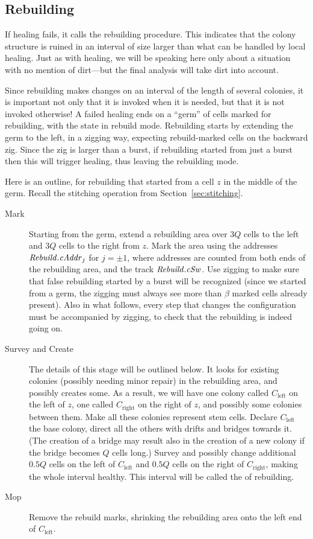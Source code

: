 \documentclass[12pt]{memoir}
\newcommand{\fld}[1]{\ensuremath{\textit{#1\/}}}
\newcommand{\Q}{Q}
\newcommand{\cAddr}{\fld{cAddr}}
\newcommand{\Rebuild}{\fld{Rebuild}}
\newcommand{\cSweep}{\fld{cSw}}
\newcommand{\Left}{\text{left}}
\newcommand{\Right}{\text{right}}
\begin{document}
\subsection{Rebuilding}\label{sec:rebuilding}

If healing fails, it calls the rebuilding procedure.
This indicates that the colony structure is ruined in an interval of size larger than 
what can be handled by local healing.
Just as with healing, we will be speaking here only about a situation with no 
mention of dirt---but the final analysis will take dirt into account.

Since rebuilding makes changes on an interval of the length of several colonies,
it is important not only that it is invoked when it is needed, but that it is not
invoked otherwise!
A failed healing ends on a ``germ'' of cells marked for rebuilding,
with the state in rebuild mode.
Rebuilding starts by extending the germ to the left, in a zigging way,
expecting rebuild-marked cells on the backward zig.
Since the zig is larger than a burst, if rebuilding started from just a burst then this
will trigger healing, thus leaving the rebuilding mode.

Here is an outline, for rebuilding that started from a cell \( z \) in the middle
of the germ.
Recall the stitching operation from Section~\ref{sec:stitching}.
\begin{description}
 \item[Mark] Starting from the germ, extend a rebuilding area  over \( 3\Q \) cells to the left 
and \( 3\Q \) cells to the right from \( z \).
Mark the area using the addresses \( \Rebuild.\cAddr_{j} \) for \( j=\pm 1 \), where addresses are counted from both 
ends of the rebuilding area, and the track \( \Rebuild.\cSweep \).
Use zigging to make sure that false rebuilding started by a burst will be recognized (since we started from a germ,
the zigging must always see more than \( \beta \) marked cells already present).
Also in what follows, every step that changes the configuration must be accompanied by zigging, to check that
the rebuilding is indeed going on.

 \item[Survey and Create]
The details of this stage will be outlined below.
It looks for existing colonies (possibly needing minor repair) in the rebuilding area, and 
possibly creates some.
As a result, we will have one colony called \( C_{\Left} \) 
on the left of \( z \), one called \( C_{\Right} \) on the right of \( z \),
and possibly some colonies between them.
Make all these colonies represent stem cells.
Declare \( C_{\Left} \) the base colony, direct all the others
with drifts and bridges towards it.
(The creation of a bridge may result also in the creation of a new 
colony if the bridge becomes \( \Q \) cells long.)
Survey and possibly change additional \( 0.5\Q \) cells on the left of \( C_{\Left} \) and \( 0.5\Q \) cells
on the right of \( C_{\Right} \), making the whole interval healthy.
This interval will be called the  of rebuilding.

\item[Mop] Remove the rebuild marks, shrinking the rebuilding area onto the left end of \( C_{\Left} \).
\end{description}
\end{document}

